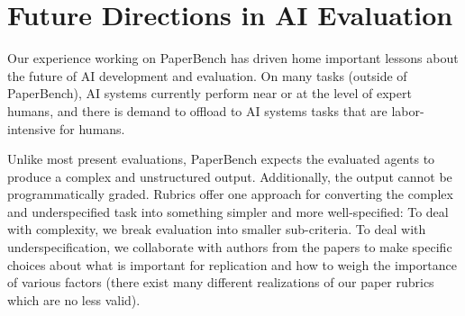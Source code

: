 \documentclass{article}
\theoremstyle{plain}
\theoremstyle{definition}
\theoremstyle{remark}
\begin{document}

\nocite{zhao_apt_2024}
\nocite{gloeckler_all--one_2024}
\nocite{cai_batch_2024}
\nocite{sun_bbox-adapter_nodate}
\nocite{wang_bridging_2024}
\nocite{frans_unsupervised_2024}
\nocite{wolczyk_fine-tuning_2024}
\nocite{xia_refined_2024}
\nocite{shi_lca---line_2024}
\nocite{lee_mechanistic_2024}
\nocite{rathore_challenges_2024}
\nocite{cheng_rice_nodate}
\nocite{schlarmann_robust_2024}
\nocite{cai_sample-specific_2024}
\nocite{singla_sapg_2024}
\nocite{sharrock_sequential_2024}
\nocite{sanchez_stay_2024}
\nocite{albergo_stochastic_2024}
\nocite{niu_test-time_2024}
\nocite{jin_what_2024}





\newpage
\appendix
\onecolumn


\section{Future Directions in AI Evaluation}
\label{app-future-directions}

Our experience working on PaperBench has driven home important lessons about the future of AI development and evaluation. On many tasks (outside of PaperBench), AI systems currently perform near or at the level of expert humans, and there is demand to offload to AI systems tasks that are labor-intensive for humans.

Unlike most present evaluations, PaperBench expects the evaluated agents to produce a complex and unstructured output. Additionally, the output cannot be programmatically graded. Rubrics \citep{sawada2023arbadvancedreasoningbenchmark, harvey_team_introducing_2024} offer one approach for converting the complex and underspecified task into something simpler and more well-specified: To deal with complexity, we break evaluation into smaller sub-criteria. To deal with underspecification, we collaborate with authors from the papers to make specific choices about what is important for replication and how to weigh the importance of various factors (there exist many different realizations of our paper rubrics which are no less valid).
\end{document}
